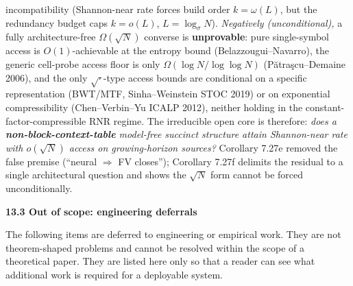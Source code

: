 \documentclass[
]{article}
\begin{document}
\begin{itemize}
  incompatibility (Shannon-near rate forces build order $k = \omega(L)$,
  but the redundancy budget caps $k = o(L)$, $L = \log_\sigma N$).
  \emph{Negatively (unconditional),} a fully architecture-free $\Omega(\sqrt
  N)$ converse is \textbf{unprovable}: pure single-symbol access is
  $O(1)$-achievable at the entropy bound (Belazzougui--Navarro), the
  generic cell-probe access floor is only $\Omega(\log N/\log\log N)$
  (P\u{a}tra\c{s}cu--Demaine 2006), and the only $\sqrt{\cdot}$-type access
  bounds are conditional on a specific representation (BWT/MTF,
  Sinha--Weinstein STOC 2019) or on exponential compressibility
  (Chen--Verbin--Yu ICALP 2012), neither holding in the
  constant-factor-compressible RNR regime. The irreducible open core is
  therefore: \emph{does a \textbf{non-block-context-table} model-free
  succinct structure attain Shannon-near rate with $o(\sqrt N)$ access on
  growing-horizon sources?} Corollary 7.27e removed the false premise
  (``neural $\Rightarrow$ FV closes''); Corollary 7.27f delimits the
  residual to a single architectural question and shows the $\sqrt N$
  form cannot be forced unconditionally.
\end{itemize}

\textbf{13.3 Out of scope: engineering deferrals}

The following items are deferred to engineering or empirical work. They
are not theorem-shaped problems and cannot be resolved within the scope
of a theoretical paper. They are listed here only so that a reader can
see what additional work is required for a deployable system.
\end{document}
